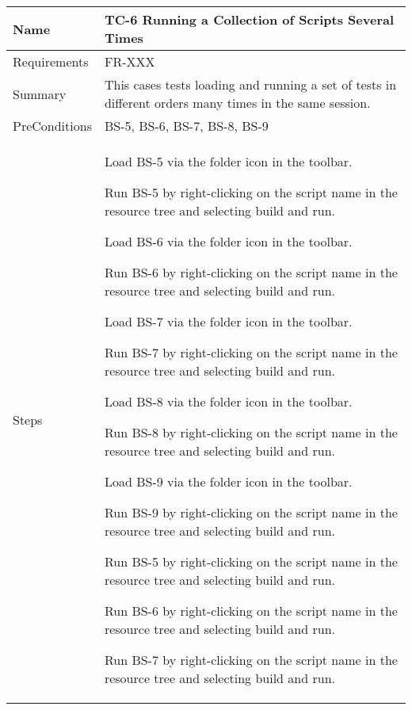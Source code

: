 \begin{table}[htbp!]
\centering
      \begin{tabular}{|p{1.05 in} |p{4.75 in} |}
      \hline
         \rowcolor[rgb]{0.8,0.8,0.8} Name & TC-6 Running a Collection of Scripts Several Times\\
         \hline
         Requirements & FR-XXX\\  \hline
         Summary & This cases tests loading and running a set of tests in different orders many times in the same session.  
         \\  \hline
         PreConditions & BS-5, BS-6, BS-7, BS-8, BS-9\\     \hline
         Steps &
         \begin{compactenum}
             \item Load BS-5 via the folder icon in the toolbar.
             \item Run BS-5 by right-clicking on the script name in the resource tree and selecting build and run.
             \item Load BS-6 via the folder icon in the toolbar.
             \item Run BS-6 by right-clicking on the script name in the resource tree and selecting build and run.
             \item Load BS-7 via the folder icon in the toolbar.
             \item Run BS-7 by right-clicking on the script name in the resource tree and selecting build and run.
             \item Load BS-8 via the folder icon in the toolbar.
             \item Run BS-8 by right-clicking on the script name in the resource tree and selecting build and run.
             \item Load BS-9 via the folder icon in the toolbar.
             \item Run BS-9 by right-clicking on the script name in the resource tree and selecting build and run.
             \item Run BS-5 by right-clicking on the script name in the resource tree and selecting build and run.
             \item Run BS-6 by right-clicking on the script name in the resource tree and selecting build and run.
             \item Run BS-7 by right-clicking on the script name in the resource tree and selecting build and run.

\end{compactenum}
\end{tabular}
\end{table}
